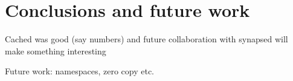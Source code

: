 \chapter{Conclusions and future work}\label{ch:future}

Cached was good (say numbers) and future collaboration with synapsed will make 
something interesting

Future work: namespaces, zero copy etc.

